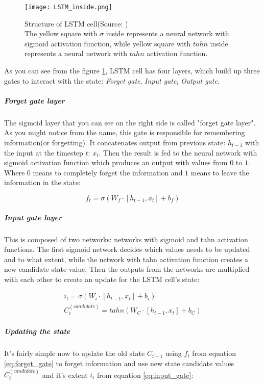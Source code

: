 \begin{figure}[H]
	\texttt{[image: LSTM\_inside.png]}
	\caption{
		Structure of LSTM cell(Source: \cite{ColahChristopher2015}) \\
		The yellow square with $\sigma$ inside represents a neural
		network with sigmoid activation function, while yellow square with $tahn$ inside represents
		a neural network with $tahn$ activation function.}

	\label{img:lstm} %
\end{figure}


As you can see from the figure \ref{img:lstm}, LSTM cell has four layers,
which build up three gates to interact with the state:
\emph{Forget gate}, \emph{Input gate}, \emph{Output gate}.


\subparagraph{Forget gate layer}
The sigmoid layer that you can see on the right side is
called "forget gate layer". As you might notice from the name, this gate is responsible
for remembering information(or forgetting). It concatenates output from previous state: $h_{t-1}$
with the input at the timestep $t$: $x_t$. Then the result is fed to the neural network
with sigmoid activation function which produces an output with values from $0$ to $1$.
Where 0 means to completely forget the information and $1$ means to leave
the information in the state:

\begin{equation} \label{eq:forget_gate}
	f_t = \sigma (W_f \cdot [h_{t-1}, x_t] + b_f)
\end{equation}

\subparagraph{Input gate layer} This is composed of two networks: networks with sigmoid
and tahn activation functions. The first sigmoid network decides which values needs
to be updated and to what extent, while the network with tahn activation function creates a
new candidate state value. Then the outputs from the networks are multiplied with each other
to create an update for the LSTM cell's state:

\begin{align} \label{eq:input_gate}
	i_t = \sigma (W_i \cdot [h_{t-1}, x_t] + b_i) \nonumber\\
	C_t^{(candidate)} = tahn(W_C \cdot [h_{t-1}, x_t] + b_C)
\end{align}

\subparagraph{Updating the state}
It's fairly simple now to update the old state $C_{t-1}$ using $f_t$ from equation
\ref{eq:forget_gate} to forget information and use new state candidate values
$C_t^{(candidate)}$ and it's extent $i_t$ from equation \ref{eq:input_gate}:

